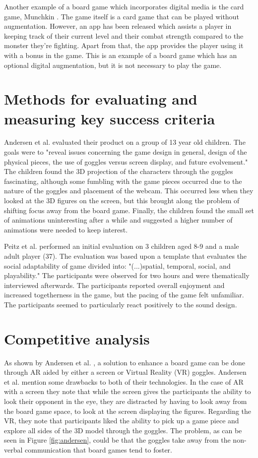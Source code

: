 Another example of a board game which incorporates digital media is the card game, Munchkin \citep{Munchkin}. The game itself is a card game that can be played without augmentation. However, an app has been released which assists a player in keeping track of their current level and their combat strength compared to the monster they're fighting. Apart from that, the app provides the player using it with a bonus in the game\citep{Munchkin}. This is an example of a board game which has an optional digital augmentation, but it is not necessary to play the game.

\section{Methods for evaluating and measuring key success criteria}
Andersen et al. \citep{andersen_designing_2004} evaluated their product on a group of 13 year old children. The goals were to "reveal issues concerning the game design in general, design of the physical pieces, the use of goggles versus screen display, and future evolvement." The children found the 3D projection of the characters through the goggles fascinating, although some fumbling with the game pieces occurred due to the nature of the goggles and placement of the webcam. This occurred less when they looked at the 3D figures on the screen, but this brought along the problem of shifting focus away from the board game.
Finally, the children found the small set of animations uninteresting after a while and suggested a higher number of animations were needed to keep interest.

Peitz et al. \citep{peitzWizards2006} performed an initial evaluation on 3 children aged 8-9 and a male adult player (37). The evaluation was based upon a template that evaluates the social adaptability of game divided into: "(...)spatial, temporal, social, and playability." The participants were observed for two hours and were thematically interviewed afterwards. The participants reported overall enjoyment and increased togetherness in the game, but the pacing of the game felt unfamiliar. The participants seemed to particularly react positively to the sound design. 

\section{Competitive analysis}
As shown by Andersen et al. \citep{andersen_designing_2004}, a solution to enhance a board game can be done through AR aided by either a screen or Virtual Reality (VR) goggles. Andersen et al. mention some drawbacks to both of their technologies. In the case of AR with a screen they note that while the screen gives the participants the ability to look their opponent in the eye, they are distracted by having to look away from the board game space, to look at the screen displaying the figures. Regarding the VR, they note that participants liked the ability to pick up a game piece and explore all sides of the 3D model through the goggles. The problem, as can be seen in Figure \ref{fig:andersen}, could be that the goggles take away from the non-verbal communication that board games tend to foster.

